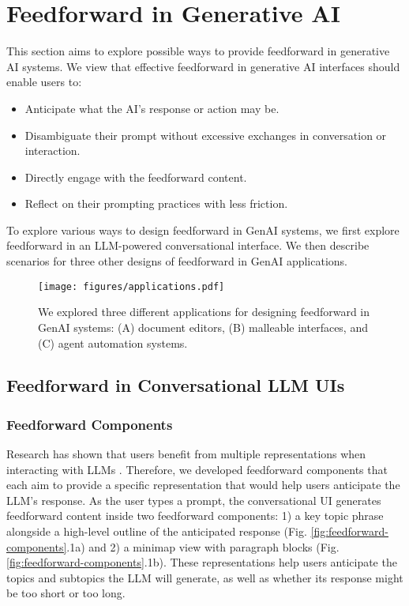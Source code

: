 \section{Feedforward in Generative AI}
\label{section:feedforward}


This section aims to explore possible ways to provide feedforward in generative AI systems. We view that effective feedforward in generative AI interfaces should enable users to:
\begin{itemize}
    \item Anticipate what the AI's response or action may be.
    \item Disambiguate their prompt without excessive exchanges in conversation or interaction.
    \item Directly engage with the feedforward content.
    \item  Reflect on their prompting practices with less friction.
\end{itemize}

To explore various ways to design feedforward in GenAI systems, we first explore feedforward in an LLM-powered conversational interface. We then describe scenarios for three other designs of feedforward in GenAI applications.


\begin{figure*}
    \centering
    \texttt{[image: figures/applications.pdf]}
    \caption{We explored three different applications for designing feedforward in GenAI systems: (A) document editors, (B) malleable interfaces, and (C) agent automation systems.}
    \label{fig:applications}
    \vspace{6pt}
\end{figure*}


\subsection{Feedforward in Conversational LLM UIs}

\subsubsection{Feedforward Components}

Research has shown that users benefit from multiple representations when interacting with LLMs \cite{graphologue, sensecape}.
Therefore, we developed feedforward components that each aim to provide a specific representation that would help users anticipate the LLM's response. 
As the user types a prompt, the conversational UI generates feedforward content inside two feedforward components: 1) a key topic phrase alongside a high-level outline of the anticipated response (Fig. \ref{fig:feedforward-components}.1a) and 2) a minimap view with paragraph blocks (Fig. \ref{fig:feedforward-components}.1b). These representations help users anticipate the topics and subtopics the LLM will generate, as well as whether its response might be too short or too long.

